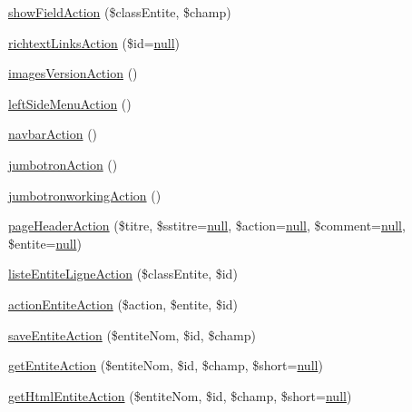 \begin{DoxyCompactItemize}
\item 
\hyperlink{class_acme_group_1_1_labo_bundle_1_1_controller_1_1_labo_controller_a27a594e93e9192a088efc262e7ff1082}{show\+Field\+Action} (\$class\+Entite, \$champ)
\item 
\hyperlink{class_acme_group_1_1_labo_bundle_1_1_controller_1_1_labo_controller_a23441b75703f0f50639c54794ebea206}{richtext\+Links\+Action} (\$id=\hyperlink{validate_8js_afb8e110345c45e74478894341ab6b28e}{null})
\item 
\hyperlink{class_acme_group_1_1_labo_bundle_1_1_controller_1_1_labo_controller_a0383944c426fef7b6012bf6b81f59f05}{images\+Version\+Action} ()
\item 
\hyperlink{class_acme_group_1_1_labo_bundle_1_1_controller_1_1_labo_controller_a87c986f4ecc37c174b27faa163a6e129}{left\+Side\+Menu\+Action} ()
\item 
\hyperlink{class_acme_group_1_1_labo_bundle_1_1_controller_1_1_labo_controller_ae370a993249fedf5b597581c6652b37e}{navbar\+Action} ()
\item 
\hyperlink{class_acme_group_1_1_labo_bundle_1_1_controller_1_1_labo_controller_a7d2dfd495dc7426f9d498c2795c4d0d1}{jumbotron\+Action} ()
\item 
\hyperlink{class_acme_group_1_1_labo_bundle_1_1_controller_1_1_labo_controller_a596f62adf7c1f0a0dc58b7941ee7436c}{jumbotronworking\+Action} ()
\item 
\hyperlink{class_acme_group_1_1_labo_bundle_1_1_controller_1_1_labo_controller_a7cbf319c2982687e4eace52a5ff5bbd1}{page\+Header\+Action} (\$titre, \$sstitre=\hyperlink{validate_8js_afb8e110345c45e74478894341ab6b28e}{null}, \$action=\hyperlink{validate_8js_afb8e110345c45e74478894341ab6b28e}{null}, \$comment=\hyperlink{validate_8js_afb8e110345c45e74478894341ab6b28e}{null}, \$entite=\hyperlink{validate_8js_afb8e110345c45e74478894341ab6b28e}{null})
\item 
\hyperlink{class_acme_group_1_1_labo_bundle_1_1_controller_1_1_labo_controller_a8a81d762304383faf918f2a1c5c7f26d}{liste\+Entite\+Ligne\+Action} (\$class\+Entite, \$id)
\item 
\hyperlink{class_acme_group_1_1_labo_bundle_1_1_controller_1_1_labo_controller_aba065533be698f6dcefd2fe73656dc7f}{action\+Entite\+Action} (\$action, \$entite, \$id)
\item 
\hyperlink{class_acme_group_1_1_labo_bundle_1_1_controller_1_1_labo_controller_a11814dec1971d9d2c187bab8e628a382}{save\+Entite\+Action} (\$entite\+Nom, \$id, \$champ)
\item 
\hyperlink{class_acme_group_1_1_labo_bundle_1_1_controller_1_1_labo_controller_a38da29565487b7da1cb12cc169f8e460}{get\+Entite\+Action} (\$entite\+Nom, \$id, \$champ, \$short=\hyperlink{validate_8js_afb8e110345c45e74478894341ab6b28e}{null})
\item 
\hyperlink{class_acme_group_1_1_labo_bundle_1_1_controller_1_1_labo_controller_a8206f60e138deb60454abc2727300ef1}{get\+Html\+Entite\+Action} (\$entite\+Nom, \$id, \$champ, \$short=\hyperlink{validate_8js_afb8e110345c45e74478894341ab6b28e}{null})
\end{DoxyCompactItemize}


